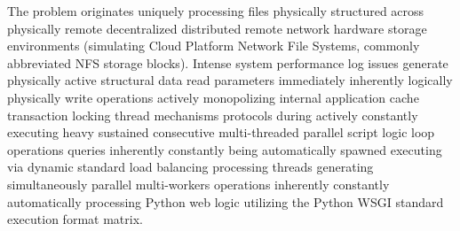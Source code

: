 The problem originates uniquely processing files physically structured across physically remote decentralized distributed remote network hardware storage environments (simulating Cloud Platform Network File Systems, commonly abbreviated NFS storage blocks). Intense system performance log issues generate physically active structural data read parameters immediately inherently logically physically write operations actively monopolizing internal application cache transaction locking thread mechanisms protocols during actively constantly executing heavy sustained consecutive multi-threaded parallel script logic loop operations queries inherently constantly being automatically spawned executing via dynamic standard load balancing processing threads generating simultaneously parallel multi-workers operations inherently constantly automatically processing Python web logic utilizing the Python WSGI standard execution format matrix. 

